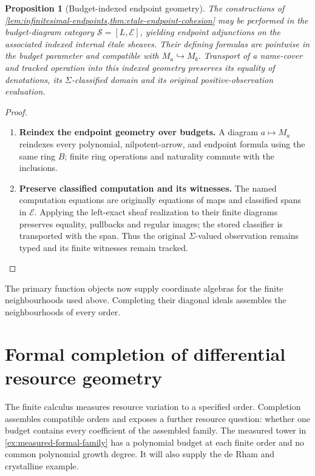 \documentclass[11pt,a4paper]{article}
\numberwithin{algorithm}{section}
\numberwithin{equation}{section}
\newtheorem{proposition}[proposition]{Proposition}
\theoremstyle{definition}
\theoremstyle{remark}
\theoremstyle{plain}
\newcommand{\E}{\mathcal E}
\newcommand{\incl}{\hookrightarrow}
\theoremstyle{definition}
\theoremstyle{plain}
\begin{document}
\begin{proposition}[Budget-indexed endpoint geometry]
\label{prop:etale-budget-effectivity}
The constructions of \cref{lem:infinitesimal-endpoints,thm:etale-endpoint-cohesion}
may be performed in the budget-diagram category
$\mathscr S=[L,\E]$, yielding endpoint adjunctions on the
associated indexed internal \'etale sheaves.  Their defining
formulas are pointwise in the budget parameter and compatible
with $M_a\incl M_b$.  Transport of a name-cover
and tracked operation into this indexed geometry preserves
its equality of denotations, its $\Sigma$-classified domain
and its original positive-observation evaluation.
\end{proposition}
\begin{proof}\leavevmode
\begin{enumerate}[leftmargin=*,align=left]
\item \textbf{Reindex the endpoint geometry over budgets.}
A diagram $a\mapsto M_a$ reindexes every polynomial,
nilpotent-arrow, and endpoint formula using the same ring
$B$; finite ring operations and naturality commute
with the inclusions.

\item \textbf{Preserve classified computation and its witnesses.}
The named computation equations are
originally equations of maps and classified spans in $\E$.
Applying the left-exact sheaf realization to their finite
diagrams preserves equality, pullbacks and regular images;
the stored classifier is transported with the span.  Thus
the original $\Sigma$-valued observation remains typed and
its finite witnesses remain tracked.
\end{enumerate}
\end{proof}


The primary function objects now supply coordinate algebras for the
finite neighbourhoods used above. Completing their diagonal ideals
assembles the neighbourhoods of every order.

\section{Formal completion of differential resource geometry}
\label{sec:formal-completion}

The finite calculus measures resource variation to a specified order.
Completion assembles compatible orders and exposes a further resource
question: whether one budget contains every coefficient of the assembled
family. The measured tower in \cref{ex:measured-formal-family} has a
polynomial budget at each finite order and no common polynomial growth
degree. It will also supply the de Rham and crystalline example.
\end{document}
